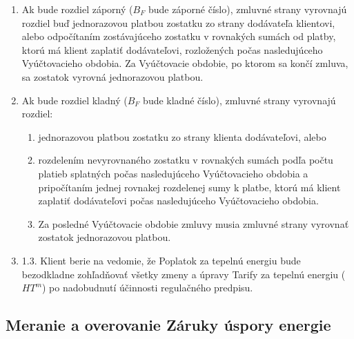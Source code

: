 \begin{enumerate}
	\item Ak bude rozdiel záporný ($B_F$ bude záporné číslo), zmluvné strany vyrovnajú rozdiel buď jednorazovou platbou zostatku zo strany dodávateľa klientovi, alebo odpočítaním zostávajúceho zostatku v rovnakých sumách od platby, ktorú má klient zaplatiť dodávateľovi, rozložených počas nasledujúceho Vyúčtovacieho obdobia. Za Vyúčtovacie obdobie, po ktorom sa končí zmluva, sa zostatok vyrovná jednorazovou platbou.

	\item Ak bude rozdiel kladný ($B_F$ bude kladné číslo), zmluvné strany vyrovnajú rozdiel:
	\begin{enumerate}
	\item jednorazovou platbou zostatku zo strany klienta dodávateľovi, alebo
	\item rozdelením nevyrovnaného zostatku v rovnakých sumách podľa počtu platieb splatných počas nasledujúceho Vyúčtovacieho obdobia a pripočítaním jednej rovnakej rozdelenej sumy k platbe, ktorú má klient zaplatiť dodávateľovi počas nasledujúceho Vyúčtovacieho obdobia.  
	\item Za posledné Vyúčtovacie obdobie zmluvy musia zmluvné strany vyrovnať zostatok jednorazovou platbou.
	\end{enumerate}

	\item 1.3.	Klient berie na vedomie, že Poplatok za tepelnú energiu bude bezodkladne zohľadňovať všetky zmeny a úpravy Tarify za tepelnú energiu ($HT^m$) po nadobudnutí účinnosti regulačného predpisu.
\end{enumerate}


\subsection{Meranie a overovanie Záruky úspory energie}

